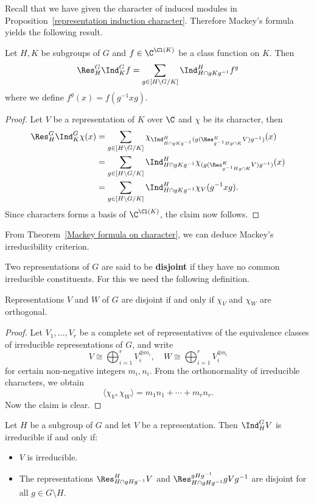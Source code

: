 Recall that we have given the character of induced modules in Proposition~\ref{representation induction character}. Therefore Mackey's formula yields the following result. 
\begin{theorem}\label{Mackey formula on character}
Let $H,K$ be subgroups of $G$ and $f\in\C^{\Cl(K)}$ be a class function on $K$. Then
\[\Res^G_H\Ind^G_Kf=\sum_{g\in[H\backslash G/K]}\Ind^H_{H\cap gKg^{-1}}f^g\]
where we define $f^g(x)=f(g^{-1}xg)$.
\end{theorem}
\begin{proof}
Let $V$ be a representation of $K$ over $\C$ and $\chi$ be its character, then
\begin{align*}
\Res^G_H\Ind^G_K\chi(x)&=\sum_{g\in[H\backslash G/K]}\chi_{\Ind^H_{H\cap gKg^{-1}}(g(\Res^K_{g^{-1}Hg\cap K}V)g^{-1})}(x)\\
&=\sum_{g\in[H\backslash G/K]}\Ind^H_{H\cap gKg^{-1}}\chi_{(g(\Res^K_{g^{-1}Hg\cap K}V)g^{-1})}(x)\\
&=\sum_{g\in[H\backslash G/K]}\Ind^H_{H\cap gKg^{-1}}\chi_{V}(g^{-1}xg).
\end{align*}
Since characters forms a basis of $\C^{\Cl(K)}$, the claim now follows.
\end{proof}
From Theorem~\ref{Mackey formula on character}, we can deduce Mackey's irreducibility criterion.
\begin{definition}
Two representations of $G$ are said to be \textbf{disjoint} if they have no common irreducible constituents. For this we need the following definition.
\end{definition}
\begin{proposition}\label{representation disjoint iff character}
Representations $V$ and $W$ of $G$ are disjoint if and only if $\chi_V$ and $\chi_W$ are orthogonal.
\end{proposition}
\begin{proof}
Let $V_1,\dots,V_r$ be a complete set of representatives of the equivalence classes of irreducible representations of $G$, and write
\[V\cong\bigoplus_{i=1}^{r}V_i^{\oplus m_i},\quad W\cong\bigoplus_{i=1}^{r}V_i^{\oplus n_i}\]
for certain non-negative integers $m_i,n_i$. From the orthonormality of irreducible characters, we obtain
\[\langle\chi_V,\chi_W\rangle=m_1n_1+\cdots+m_rn_r.\]
Now the claim is clear.
\end{proof}
\begin{theorem}
Let $H$ be a subgroup of $G$ and let $V$ be a representation. Then $\Ind^G_HV$ is irreducible if and only if:
\begin{itemize}
\item $V$ is irreducible.
\item The representations $\Res^H_{H\cap gHg^{-1}}V$ and $\Res^{gHg^{-1}}_{H\cap gHg^{-1}}gVg^{-1}$ are disjoint for all $g\in G\setminus H$.
\end{itemize}
\end{theorem}
